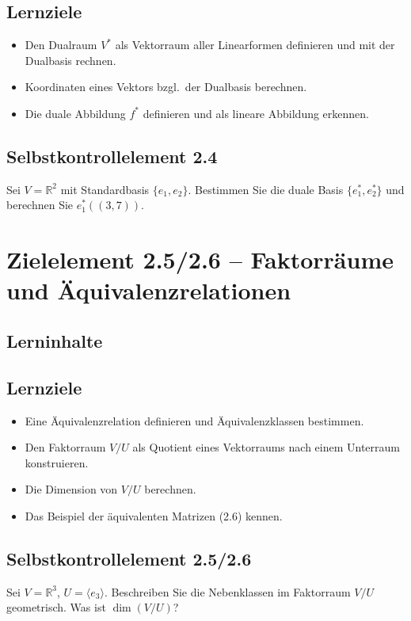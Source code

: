 \documentclass[a4paper,12pt]{article}
\begin{document}
\subsection*{Lernziele}
\begin{itemize}
  \item Den Dualraum $V^*$ als Vektorraum aller Linearformen definieren und mit der Dualbasis rechnen.
  \item Koordinaten eines Vektors bzgl.\ der Dualbasis berechnen.
  \item Die duale Abbildung $f^*$ definieren und als lineare Abbildung erkennen.
\end{itemize}

\subsection*{Selbstkontrollelement 2.4}
Sei $V = \mathbb{R}^2$ mit Standardbasis $\{e_1, e_2\}$. Bestimmen Sie die duale Basis $\{e_1^*, e_2^*\}$ und berechnen Sie $e_1^*((3,7))$.

\newpage

\section*{Zielelement 2.5/2.6 -- Faktorräume und Äquivalenzrelationen}

\subsection*{Lerninhalte}
\begin{center}
\end{center}

\subsection*{Lernziele}
\begin{itemize}
  \item Eine Äquivalenzrelation definieren und Äquivalenzklassen bestimmen.
  \item Den Faktorraum $V/U$ als Quotient eines Vektorraums nach einem Unterraum konstruieren.
  \item Die Dimension von $V/U$ berechnen.
  \item Das Beispiel der äquivalenten Matrizen (2.6) kennen.
\end{itemize}

\subsection*{Selbstkontrollelement 2.5/2.6}
Sei $V = \mathbb{R}^3$, $U = \langle e_3 \rangle$. Beschreiben Sie die Nebenklassen im Faktorraum $V/U$ geometrisch. Was ist $\dim(V/U)$?
\end{document}
